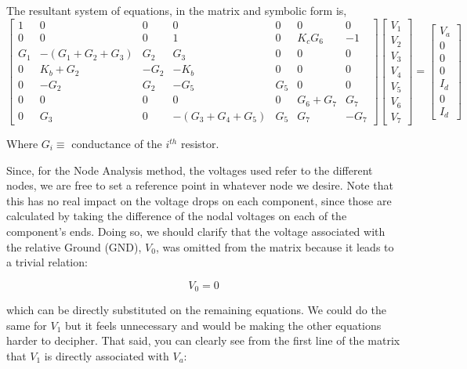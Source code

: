The resultant system of equations, in the matrix and symbolic form is,\\
\begin{equation}
\label{eq:node}
\begin{bmatrix}
1 & 0 & 0 & 0 & 0 & 0 & 0 \\
0 & 0 & 0  & 1 & 0 & K_cG_6 & -1 \\
G_1 & -(G_1+G_2+G_3) & G_2 & G_3 & 0 & 0 & 0  \\
0 & K_b+G_2 & -G_2 & -K_b & 0 & 0 & 0 \\
0 & -G_2 & G_2 & -G_5 & G_5 & 0 & 0 \\
0 & 0 & 0 & 0 & 0 & G_6+G_7 & G_7 \\
0 & G_3 & 0 & -(G_3+G_4+G_5) & G_5 & G_7 & -G_7
\end{bmatrix}
\begin{bmatrix}
V_1 \\
V_2 \\
V_3 \\
V_4 \\
V_5 \\
V_6 \\
V_7 
\end{bmatrix}
=
\begin{bmatrix}
V_a \\
0 \\
0 \\
0 \\ 
I_d \\
0 \\
I_d 
\end{bmatrix}
\end{equation}

Where $G_i\equiv $ conductance of the $i^{th}$ resistor.

\vspace{0.75cm}

Since, for the Node Analysis method, the voltages used refer to the different nodes, we are free to set a reference point in whatever node we desire. Note that this has no real impact on the voltage drops on each component, since those are calculated by taking the difference of the nodal voltages on each of the component's ends. Doing so, we should clarify that the voltage associated with the relative Ground (GND), $V_0$, was omitted from the matrix because it leads to a trivial relation: 

\begin{equation}
  V_0 = 0  
\end{equation}

\noindent which can be directly substituted on the remaining equations. We could do the same for $V_1$ but it feels unnecessary and would be making the other equations harder to decipher. That said, you can clearly see from the first line of the matrix that $V_1$ is directly associated with $V_a$:

